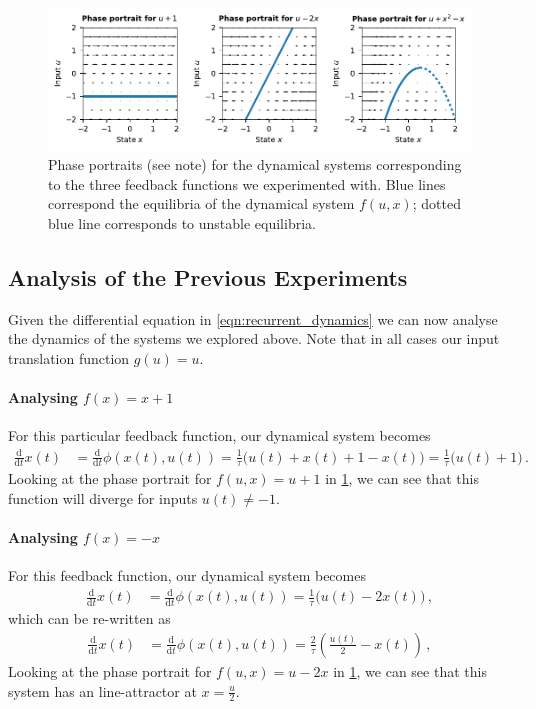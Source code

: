 \documentclass[10pt,letterpaper,oneside]{article}
\begin{document}
\begin{figure}
	\centering
	\includegraphics{media/phase_portraits.pdf}
	\caption{Phase portraits (see note) for the dynamical systems corresponding to the three feedback functions we experimented with. Blue lines correspond the equilibria of the dynamical system $f(u, x)$; dotted blue line corresponds to unstable equilibria.  }
	\label{fig:phase_portraits}
\end{figure}

\subsection{Analysis of the Previous Experiments}

Given the differential equation in \cref{eqn:recurrent_dynamics} we can now analyse the dynamics of the systems we explored above. Note that in all cases our input translation function $g(u) = u$.

\paragraph{Analysing $f(x) = x + 1$}
For this particular feedback function, our dynamical system becomes
\begin{align*}
	\frac{\mathrm{d}}{\mathrm{d}t} x(t) &= \frac{\mathrm{d}}{\mathrm{d}t} \phi(x(t), u(t)) = \frac{1}{\tau} \big(u(t) + x(t) + 1 - x(t) \big) = \frac{1}{\tau} \big(u(t) + 1 \big) \,.
\end{align*}
Looking at the phase portrait for $f(u, x) = u + 1$ in \cref{fig:phase_portraits}, we can see that this function will diverge for inputs $u(t) \neq -1$.

\paragraph{Analysing $f(x) = -x$}
For this feedback function, our dynamical system becomes
\begin{align*}
	\frac{\mathrm{d}}{\mathrm{d}t} x(t) &= \frac{\mathrm{d}}{\mathrm{d}t} \phi(x(t), u(t)) = \frac{1}{\tau} \big(u(t) - 2 x(t) \big) \,,
\end{align*}
which can be re-written as
\begin{align*}
	\frac{\mathrm{d}}{\mathrm{d}t} x(t) &= \frac{\mathrm{d}}{\mathrm{d}t} \phi(x(t), u(t)) = \frac{2}{\tau} \left(\frac{u(t)}{2} - x(t) \right) \,,
\end{align*}
Looking at the phase portrait for $f(u, x) = u - 2x$ in \cref{fig:phase_portraits}, we can see that this system has an line-attractor at $x = \frac{u}{2}$.
\end{document}
